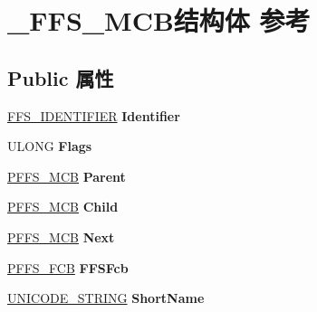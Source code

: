 \hypertarget{struct___f_f_s___m_c_b}{}\section{\+\_\+\+F\+F\+S\+\_\+\+M\+C\+B结构体 参考}
\label{struct___f_f_s___m_c_b}
\subsection*{Public 属性}
\begin{DoxyCompactItemize}
\item 
\mbox{\label{struct___f_f_s___m_c_b_ac2725329f8a93e519ef13f8022c95325}} 
\hyperlink{struct___f_f_s___i_d_e_n_t_i_f_i_e_r}{F\+F\+S\+\_\+\+I\+D\+E\+N\+T\+I\+F\+I\+ER} {\bfseries Identifier}
\item 
\mbox{\label{struct___f_f_s___m_c_b_a326fa515ec3256fcd151f4c01d4b3528}} 
U\+L\+O\+NG {\bfseries Flags}
\item 
\mbox{\label{struct___f_f_s___m_c_b_a4692fc44d729771f67aa22ae3025cc0a}} 
\hyperlink{struct___f_f_s___m_c_b}{P\+F\+F\+S\+\_\+\+M\+CB} {\bfseries Parent}
\item 
\mbox{\label{struct___f_f_s___m_c_b_a794c80ad3205d3a870a15c7dae716050}} 
\hyperlink{struct___f_f_s___m_c_b}{P\+F\+F\+S\+\_\+\+M\+CB} {\bfseries Child}
\item 
\mbox{\label{struct___f_f_s___m_c_b_a529e83e6cf276558561c430cc386e115}} 
\hyperlink{struct___f_f_s___m_c_b}{P\+F\+F\+S\+\_\+\+M\+CB} {\bfseries Next}
\item 
\mbox{\label{struct___f_f_s___m_c_b_aa8d953b88a618155f5c786b3c7050a2e}} 
\hyperlink{struct___f_f_s___f_c_b}{P\+F\+F\+S\+\_\+\+F\+CB} {\bfseries F\+F\+S\+Fcb}
\item 
\mbox{\label{struct___f_f_s___m_c_b_a263048f5a38d80be3080baf2bc10585b}} 
\hyperlink{struct___u_n_i_c_o_d_e___s_t_r_i_n_g}{U\+N\+I\+C\+O\+D\+E\+\_\+\+S\+T\+R\+I\+NG} {\bfseries Short\+Name}
\item 
\mbox{\label{struct___f_f_s___m_c_b_adda548d92d855a4ed8ca5e62409c09f8}} 

\end{DoxyCompactItemize}
